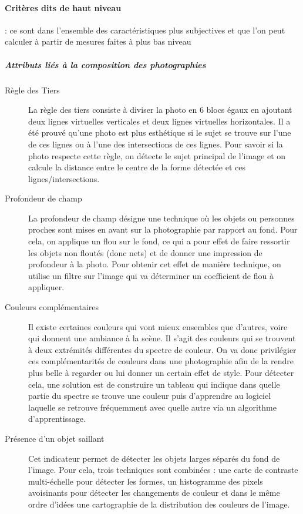 \documentclass[11pt, french]{report-rd-info}
\begin{document}
\paragraph{Critères dits de haut niveau} : ce sont dans l'ensemble des caractéristiques plus subjectives et que l'on peut calculer à partir de mesures faites à plus bas niveau
\subparagraph{Attributs liés à la composition des photographies}
\begin{description}
\item[Règle des Tiers]
La règle des tiers consiste à diviser la photo en 6 blocs égaux en ajoutant deux lignes virtuelles verticales et deux lignes virtuelles horizontales. Il a  été prouvé qu’une photo est plus esthétique si le sujet se trouve sur l’une de ces lignes ou à l’une des intersections de ces lignes. Pour savoir si la photo respecte cette règle, on détecte le sujet principal de l’image et on calcule la distance entre le centre de la forme détectée et ces lignes/intersections.


\item[Profondeur de champ]
La profondeur de champ désigne une technique où les objets ou personnes proches sont mises en avant sur la photographie par rapport au fond. Pour cela, on applique un flou sur  le fond, ce qui a pour effet de faire ressortir les objets non floutés (donc nets) et de donner une impression de profondeur à la photo. Pour obtenir cet effet de manière technique, on utilise un filtre sur l’image qui va déterminer un coefficient de flou à appliquer.


\item[Couleurs complémentaires]
Il existe certaines couleurs qui vont mieux ensembles que d’autres, voire qui donnent une ambiance à la scène. Il s’agit des couleurs qui se trouvent à deux extrémités différentes du spectre de couleur. On va donc privilégier ces complémentarités de couleurs dans une photographie afin de la rendre plus belle à regarder ou lui donner un certain effet de style. Pour détecter cela, une solution est de construire un tableau  qui indique dans quelle partie du spectre se trouve une couleur puis d’apprendre au logiciel laquelle se retrouve fréquemment  avec quelle autre via un algorithme d’apprentissage.


\item[Présence d'un objet saillant]
Cet indicateur permet de détecter les objets larges séparés du fond de l’image. Pour cela, trois techniques sont combinées : une carte de contraste multi-échelle pour détecter les formes, un histogramme des pixels avoisinants pour détecter les changements de couleur et dans le même ordre d’idées une cartographie de la distribution des couleurs de l’image.
\end{description}
\end{document}
